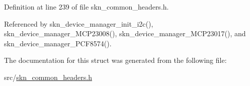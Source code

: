 Definition at line 239 of file skn\+\_\+common\+\_\+headers.\+h.



Referenced by skn\+\_\+device\+\_\+manager\+\_\+init\+\_\+i2c(), skn\+\_\+device\+\_\+manager\+\_\+\+M\+C\+P23008(), skn\+\_\+device\+\_\+manager\+\_\+\+M\+C\+P23017(), and skn\+\_\+device\+\_\+manager\+\_\+\+P\+C\+F8574().



The documentation for this struct was generated from the following file\+:\begin{DoxyCompactItemize}
\item 
src/\hyperlink{skn__common__headers_8h}{skn\+\_\+common\+\_\+headers.\+h}\end{DoxyCompactItemize}
